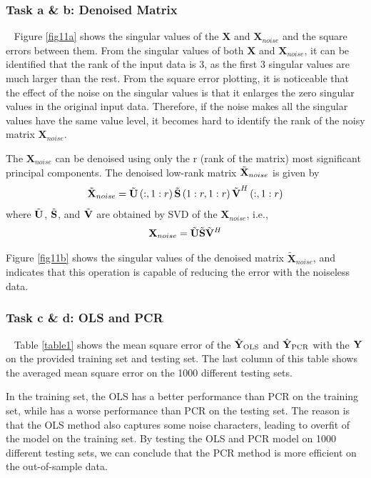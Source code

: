 \documentclass[10pt]{article}
\begin{document}
\subsubsection{Task a \& b: Denoised Matrix}
\ \indent
Figure \ref{fig11a} shows the singular values of the $\mathbf{X}$ and 
$\mathbf{X}_{noise}$ and the square errors between them. 
From the singular values of both $\mathbf{X}$ and $\mathbf{X}_{noise}$, 
it can be identified that the rank of the input data is 3, as the first 3 
singular values are much larger than the rest. From the square error 
plotting, it is noticeable that the effect of the noise on the singular 
values is that it enlarges the zero singular values in the original input 
data. Therefore, if the noise makes all the singular values have the same 
value level, it becomes hard to identify the rank of the noisy matrix 
$\mathbf{X}_{noise}$.

The $\mathbf{X}_{noise}$ can be denoised using only the r (rank of the
 matrix) most significant principal components. The denoised low-rank 
 matrix ${\tilde{{\bf{X}}}}_{noise}$ is given by
 \begin{equation}
	{\tilde{{\bf{X}}}}_{noise}={\tilde{{\bf{U}}}\left(:,1:r\right)\tilde{{\bf{S}}}\left(1:r,1:r\right)\tilde{{\bf{V}}}}^H\left(:,1:r\right)
 \end{equation}
 where $\tilde{\bf{U}}$, $\tilde{{\bf{S}}}$, and $\tilde{{\bf{V}}}$ are obtained by 
 SVD of the $\mathbf{X}_{noise}$, i.e.,
 \begin{equation}
	\mathbf{X}_{noise}=\tilde{{\bf{U}}} \tilde{\bf{S}} \tilde{{\bf{V}}}^H
 \end{equation}

Figure \ref{fig11b} shows the singular values of the denoised matrix 
${\tilde{\mathbf{X}}}_{noise}$, and indicates that this operation
is capable of reducing the error with the noiseless data.

\subsubsection{Task c \& d: OLS and PCR}
\ \indent
Table \ref{table1} shows the mean square error of the ${\hat{{\bf{Y}}}}_{\text{OLS}}$ and 
${\hat{{\bf{Y}}}}_{\text{PCR}}$ with the $\bf{Y}$ on the provided training set and testing set. 
The last column of this table shows the averaged mean square error on the 
1000 different testing sets. 

In the training set, the OLS has a better performance than PCR on the 
training set, while has a worse performance than PCR on the testing set.
 The reason is that the OLS method also captures some noise characters, 
 leading to overfit of the model on the training set. By testing the OLS 
 and PCR model on 1000 different testing sets, we can conclude that the 
 PCR method is more efficient on the out-of-sample data.
\end{document}
